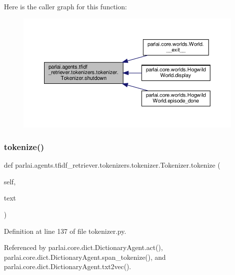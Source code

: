 Here is the caller graph for this function\+:
\nopagebreak
\begin{figure}[H]
\begin{center}
\leavevmode
\includegraphics[width=350pt]{classparlai_1_1agents_1_1tfidf__retriever_1_1tokenizers_1_1tokenizer_1_1Tokenizer_a9c4af22e2a89737e6464bf031d16e32c_icgraph}
\end{center}
\end{figure}
\mbox{\label{classparlai_1_1agents_1_1tfidf__retriever_1_1tokenizers_1_1tokenizer_1_1Tokenizer_a548699f403463496523213f3cf80c6c6}} 
\subsubsection{\texorpdfstring{tokenize()}{tokenize()}}
{\footnotesize\ttfamily def parlai.\+agents.\+tfidf\+\_\+retriever.\+tokenizers.\+tokenizer.\+Tokenizer.\+tokenize (\begin{DoxyParamCaption}\item[{}]{self,  }\item[{}]{text }\end{DoxyParamCaption})}



Definition at line 137 of file tokenizer.\+py.



Referenced by parlai.\+core.\+dict.\+Dictionary\+Agent.\+act(), parlai.\+core.\+dict.\+Dictionary\+Agent.\+span\+\_\+tokenize(), and parlai.\+core.\+dict.\+Dictionary\+Agent.\+txt2vec().

